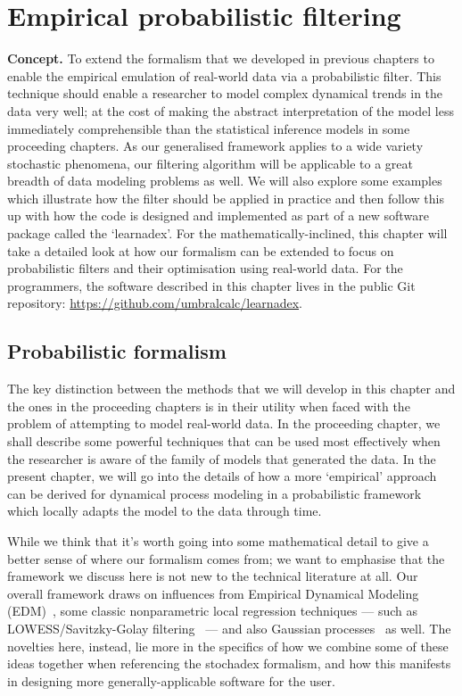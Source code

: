 \chapter{\sffamily Empirical probabilistic filtering}

{\bfseries\sffamily Concept.} To extend the formalism that we developed in previous chapters to enable the empirical emulation of real-world data via a probabilistic filter. This technique should enable a researcher to model complex dynamical trends in the data very well; at the cost of making the abstract interpretation of the model less immediately comprehensible than the statistical inference models in some proceeding chapters. As our generalised framework applies to a wide variety stochastic phenomena, our filtering algorithm will be applicable to a great breadth of data modeling problems as well. We will also explore some examples which illustrate how the filter should be applied in practice and then follow this up with how the code is designed and implemented as part of a new software package called the `learnadex'. For the mathematically-inclined, this chapter will take a detailed look at how our formalism can be extended to focus on probabilistic filters and their optimisation using real-world data. For the programmers, the software described in this chapter lives in the public Git repository: \href{https://github.com/umbralcalc/learnadex}{https://github.com/umbralcalc/learnadex}.

\section{\sffamily Probabilistic formalism}

The key distinction between the methods that we will develop in this chapter and the ones in the proceeding chapters is in their utility when faced with the problem of attempting to model real-world data. In the proceeding chapter, we shall describe some powerful techniques that can be used most effectively when the researcher is aware of the family of models that generated the data. In the present chapter, we will go into the details of how a more `empirical' approach can be derived for dynamical process modeling in a probabilistic framework which locally adapts the model to the data through time. 

While we think that it's worth going into some mathematical detail to give a better sense of where our formalism comes from; we want to emphasise that the framework we discuss here is not new to the technical literature at all. Our overall framework draws on influences from Empirical Dynamical Modeling (EDM)~\cite{sugihara1990nonlinear}, some classic nonparametric local regression techniques --- such as LOWESS/Savitzky-Golay filtering~\cite{savitzky1964smoothing} --- and also Gaussian processes~\cite{murphy2012machine} as well. The novelties here, instead, lie more in the specifics of how we combine some of these ideas together when referencing the stochadex formalism, and how this manifests in designing more generally-applicable software for the user.

